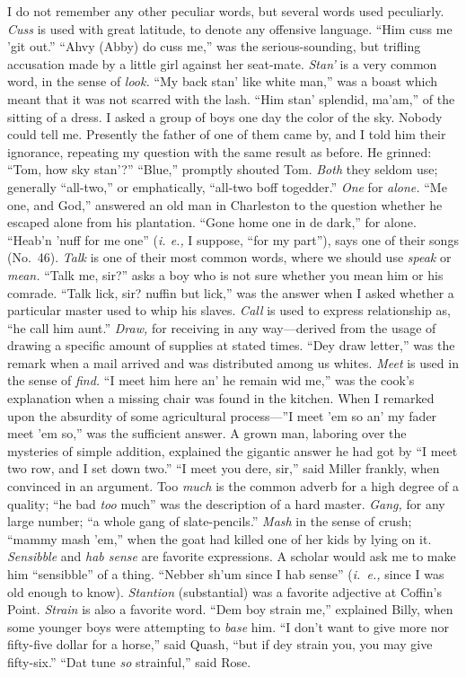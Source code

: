 \documentclass[a5paper,10pt]{book}
\begin{document}
I do not remember any other peculiar words, but several words used
peculiarly.  \emph{Cuss} is used with great latitude, to denote any
offensive language.  ``Him cuss me 'git out.''  ``Ahvy (Abby) do cuss
me,'' was the serious-sounding, but trifling accusation made by a
little girl against her seat-mate.  \emph{Stan'} is a very common
word, in the sense of \emph{look.}  ``My back stan' like white man,''
was a boast which meant that it was not scarred with the lash.  ``Him
stan' splendid, ma'am,'' of the sitting of a dress.  I asked a group
of boys one day the color of the sky.  Nobody could tell me.
Presently the father of one of them came by, and I told him their
ignorance, repeating my question with the same result as before.  He
grinned: ``Tom, how sky stan'?''  ``Blue,'' promptly shouted Tom.
\emph{Both} they seldom use; generally ``all-two,'' or emphatically,
``all-two boff togedder.''  \emph{One} for \emph{alone.}  ``Me one,
and God,'' answered an old man in Charleston to the question whether
he escaped alone from his plantation.  ``Gone home one in de dark,''
for alone.  ``Heab'n 'nuff for me one'' (\emph{i. e.,} I suppose,
``for my part''), says one of their songs (No.~46).  \emph{Talk} is
one of their most common words, where we should use \emph{speak} or
\emph{mean.}  ``Talk me, sir?'' asks a boy who is not sure whether you
mean him or his comrade.  ``Talk lick, sir?  nuffin but lick,'' was
the answer when I asked whether a particular master used to whip his
slaves.  \emph{Call} is used to express relationship as, ``he call him
aunt.''  \emph{Draw,} for receiving in any way---derived from the
usage of drawing a specific amount of supplies at stated times.  ``Dey
draw letter,'' was the remark when a mail arrived and was distributed
among us whites.  \emph{Meet} is used in the sense of \emph{find.}
``I meet him here an' he remain wid me,'' was the cook's explanation
when a missing chair was found in the kitchen.  When I remarked upon
the absurdity of some agricultural process---''I meet 'em so an' my
fader meet 'em so,'' was the sufficient answer.  A grown man, laboring
over the mysteries of simple addition, explained the gigantic answer
he had got by ``I meet two row, and I set down two.''  ``I meet you
dere, sir,'' said Miller frankly, when convinced in an argument.  Too
\emph{much} is the common adverb for a high degree of a quality; ``he
bad \emph{too} much'' was the description of a hard master.
\emph{Gang,} for any large number; ``a whole gang of slate-pencils.''
\emph{Mash} in the sense of crush; ``mammy mash 'em,'' when the goat
had killed one of her kids by lying on it.  \emph{Sensibble} and
\emph{hab sense} are favorite expressions.  A scholar would ask me to
make him ``sensibble'' of a thing.  ``Nebber sh'um since I hab sense''
(\emph{i.~e.,} since I was old enough to know).  \emph{Stantion}
(substantial) was a favorite adjective at Coffin's Point.
\emph{Strain} is also a favorite word.  ``Dem boy strain me,''
explained Billy, when some younger boys were attempting to \emph{base}
him.  ``I don't want to give more nor fifty-five dollar for a horse,''
said Quash, ``but if dey strain you, you may give fifty-six.''  ``Dat
tune \emph{so} strainful,'' said Rose.
\end{document}
